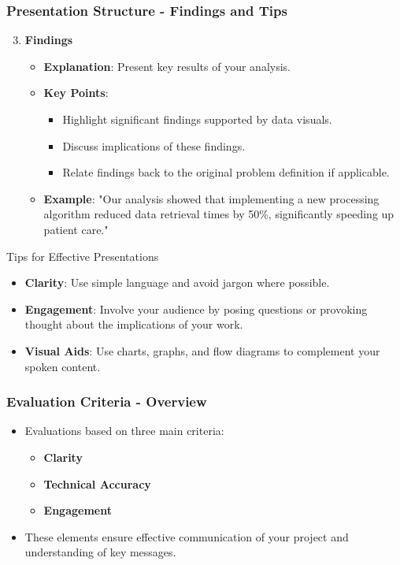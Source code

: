 \documentclass{beamer}
\begin{document}
\begin{frame}[fragile]
    \frametitle{Presentation Structure - Findings and Tips}
    \begin{enumerate}
        \setcounter{enumi}{2} %
        \item \textbf{Findings}
            \begin{itemize}
                \item \textbf{Explanation}: Present key results of your analysis.
                \item \textbf{Key Points}:
                    \begin{itemize}
                        \item Highlight significant findings supported by data visuals.
                        \item Discuss implications of these findings.
                        \item Relate findings back to the original problem definition if applicable.
                    \end{itemize}
                \item \textbf{Example}: "Our analysis showed that implementing a new processing algorithm reduced data retrieval times by 50\%, significantly speeding up patient care."
            \end{itemize}
    \end{enumerate}

    \begin{block}{Tips for Effective Presentations}
        \begin{itemize}
            \item \textbf{Clarity}: Use simple language and avoid jargon where possible.
            \item \textbf{Engagement}: Involve your audience by posing questions or provoking thought about the implications of your work.
            \item \textbf{Visual Aids}: Use charts, graphs, and flow diagrams to complement your spoken content.
        \end{itemize}
    \end{block}

\end{frame}

\begin{frame}[fragile]
    \frametitle{Evaluation Criteria - Overview}
    \begin{itemize}
        \item Evaluations based on three main criteria:
        \begin{itemize}
            \item \textbf{Clarity}
            \item \textbf{Technical Accuracy}
            \item \textbf{Engagement}
        \end{itemize}
        \item These elements ensure effective communication of your project and understanding of key messages.
    \end{itemize}
\end{frame}
\end{document}
